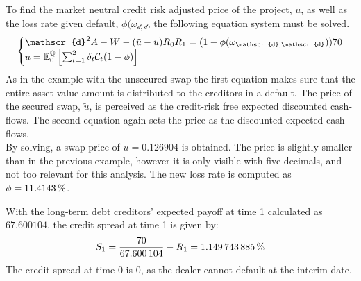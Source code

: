 \documentclass[main.tex]{subfiles}
\begin{document}
            To find the market neutral credit risk adjusted price of the project, $u$, 
            as well as the loss rate given default, $\phi(\omega_{\mathscr{d},\mathscr{d}}$,
            the following equation system must be solved.
            \begin{equation}
                \left\{\begin{array}{@{}l@{}}
                    \mathscr{d}^{2} A - W - (\tilde{u}-u)R_{0}R_{1}
                    =
                    (1-\phi(\omega_{\mathscr{d},\mathscr{d}}))\num{70}
                    \\
                    u =
                    \mathbb{E}_{0}^{\rnmeasure}\left[
                        \sum_{t=1}^{2}
                        \delta_{t}\mathcal{C}_{t}
                        (1-\phi)
                    \right]
                \end{array}\right.
            \end{equation}
            As in the example with the unsecured swap the first equation makes sure
            that the entire asset value amount is distributed to the creditors in a default.
            The price of the secured swap, $\tilde{u}$, is perceived as the credit-risk free expected discounted cash-flows.
            The second equation again sets the price as the discounted expected cash flows.
            \\
            By solving, a swap price of $u=\num{0.126904}$ is obtained.
            The price is slightly smaller than in the previous example,
            however it is only visible with five decimals,
            and not too relevant for this analysis.
            The new loss rate is computed as $\phi = \pct{0.114143}$.

            With the long-term debt creditors' expected payoff at time 1 calculated as $\num{67.600104}$,
            the credit spread at time 1 is given by:
            \begin{equation}
                S_1 =
                \frac{
                    \num{70}
                }{
                    \num{67.600104}
                }
                - R_{1}
                \nonumber
                = \pct{0.01149743885}
            \end{equation}
            The credit spread at time 0 is 0,
            as the dealer cannot default at the interim date.
            
\end{document}
